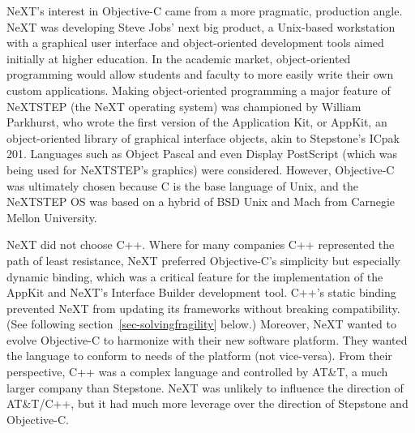 \documentclass[acmsmall]{acmart}\settopmatter{}
\begin{document}
NeXT's interest in Objective-C came from a more pragmatic, production angle. NeXT was developing Steve Jobs' next big product, a Unix-based workstation with a graphical user interface and object-oriented development tools aimed initially at higher education. In the academic market, object-oriented programming would allow students and faculty to more easily write their own custom applications. Making object-oriented programming a major feature of NeXTSTEP (the NeXT operating system) was championed by William Parkhurst, who wrote the first version of the Application Kit, or AppKit, an object-oriented library of graphical interface objects, akin to Stepstone's ICpak 201. Languages such as Object Pascal and even Display PostScript (which was being used for NeXTSTEP's graphics) were considered. However, Objective-C was ultimately chosen because C is the base language of Unix, and the NeXTSTEP OS was based on a hybrid of BSD Unix and Mach from Carnegie Mellon University.

NeXT did not choose C++. Where for many companies C++ represented the path of least resistance, NeXT preferred Objective-C's simplicity but especially dynamic binding, which was a critical feature for the implementation of the AppKit and NeXT's Interface Builder development tool. C++'s static binding prevented NeXT from updating its frameworks without breaking compatibility. (See following section~\ref{sec-solvingfragility} below.) Moreover, NeXT wanted to evolve Objective-C to harmonize with their new software platform. They wanted the language to conform to needs of the platform (not vice-versa). From their perspective, C++ was a complex language and controlled by AT\&T, a much larger company than Stepstone. NeXT was unlikely to influence the direction of AT\&T/C++, but it had much more leverage over the direction of Stepstone and Objective-C. 

\addtocounter{appendixpagenum}{1}
\end{document}
